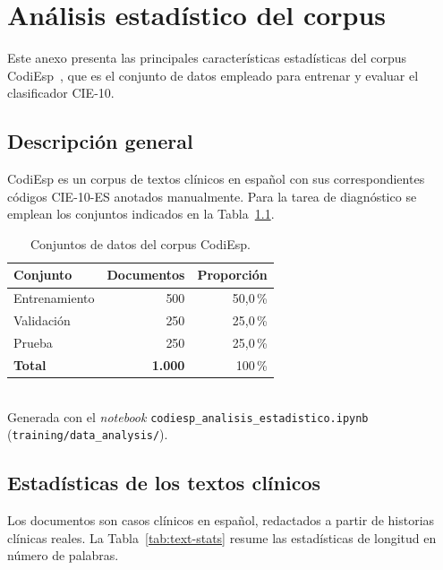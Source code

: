 \chapter{Análisis estadístico del corpus}
\label{cap:AnexoG}

Este anexo presenta las principales características estadísticas del corpus CodiEsp~\cite{miranda2020}, que es el conjunto de datos empleado para entrenar y evaluar el clasificador CIE-10.

\section{Descripción general}

CodiEsp es un corpus de textos clínicos en español con sus correspondientes códigos CIE-10-ES anotados manualmente. Para la tarea de diagnóstico se emplean los conjuntos indicados en la Tabla~\ref{tab:codiesp-splits}.

\begin{table}[h]
\centering
\caption{Conjuntos de datos del corpus CodiEsp.}
\label{tab:codiesp-splits}
\begin{tabular}{lrr}
\hline
\textbf{Conjunto} & \textbf{Documentos} & \textbf{Proporción} \\
\hline
Entrenamiento & 500 & 50{,}0\,\% \\
Validación & 250 & 25{,}0\,\% \\
Prueba & 250 & 25{,}0\,\% \\
\hline
\textbf{Total} & \textbf{1.000} & 100\,\% \\
\hline
\end{tabular}
\\[4pt]
{\footnotesize Generada con el \emph{notebook} \texttt{codiesp\_\allowbreak{}analisis\_\allowbreak{}estadistico.ipynb} (\texttt{training/\allowbreak{}data\_analysis/}).}
\end{table}

\section{Estadísticas de los textos clínicos}

Los documentos son casos clínicos en español, redactados a partir de historias clínicas reales. La Tabla~\ref{tab:text-stats} resume las estadísticas de longitud en número de palabras.

